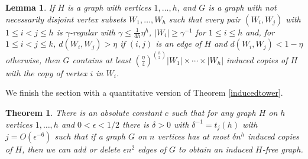 \documentclass[11pt]{article}
\newtheorem{theorem}{Theorem}[section]
\newtheorem{lemma}{Lemma}[section]
\begin{document}
\begin{lemma}
If $H$ is a graph with vertices $1,\ldots,h$, and $G$ is a graph with not
necessarily disjoint vertex subsets $W_1,\ldots,W_h$ such that every pair
$(W_i,W_j)$ with $1 \leq i < j \leq h$ is $\gamma$-regular with $\gamma \leq
\frac{1}{4h}\eta^h$, $|W_i| \geq \gamma^{-1}$ for $1 \leq i \leq h$ and, for $1
\leq i < j \leq k$, $d(W_i,W_j)>\eta$ if $(i,j)$ is an edge of $H$ and
$d(W_i,W_j)<1-\eta$ otherwise, then $G$ contains at least
$\left(\frac{\eta}{4}\right)^{{h \choose 2}}|W_1| \times \cdots \times |W_h|$
induced copies of $H$ with the copy of vertex $i$ in $W_i$.
\end{lemma}


We finish the section with a quantitative version of Theorem \ref{inducedtower}.

\begin{theorem}
There is an absolute constant $c$ such that for any graph $H$ on $h$ vertices
$1,\ldots,h$ and $0 < \epsilon< 1/2$ there is $\delta>0$ with $\delta^{-1} =
t_j(h)$ with $j=O(\epsilon^{-6})$ such that if a graph $G$ on $n$ vertices has
at most $\delta n^h$ induced copies of $H$, then we can add or delete $\epsilon
n^2$ edges of $G$ to obtain an induced $H$-free graph.
\end{theorem}
\end{document}
